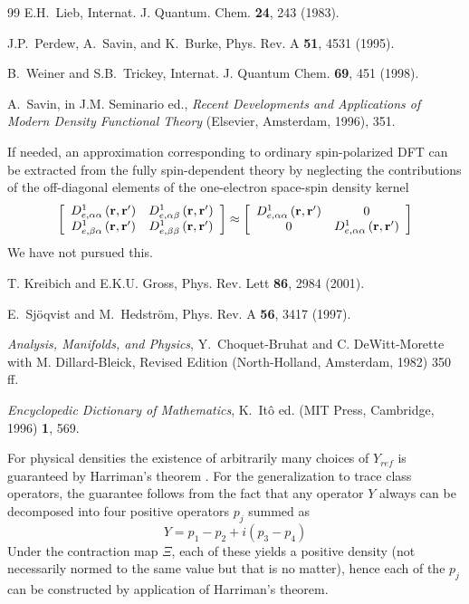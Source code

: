 \documentclass[aps,preprint]{revtex4}%
\begin{document}
\begin{thebibliography}{99}
E.H.~Lieb, Internat. J. Quantum. Chem. \textbf{24}, 243 (1983).

J.P.~Perdew, A.~Savin, and K.~Burke, Phys. Rev. A
\textbf{51}, 4531 (1995).

B.~Weiner and S.B.~Trickey, Internat. J. Quantum Chem.
\textbf{69}, 451 (1998).

A.~Savin, in J.M. Seminario ed., \textit{Recent
Developments and Applications of Modern Density Functional Theory} (Elsevier,
Amsterdam, 1996), 351.

If needed, an approximation corresponding to ordinary
spin-polarized DFT can be extracted from the fully spin-dependent theory by
neglecting the contributions of the off-diagonal elements of the one-electron
space-spin density kernel
\begin{equation}
\left[
\begin{array}
[c]{cc}%
D_{e,\alpha\alpha}^{1}\left(  \mathbf{r,r}^{\prime}\right)  & D_{e,\alpha
\beta}^{1}\left(  \mathbf{r,r}^{\prime}\right) \\
D_{e,\beta\alpha}^{1}\left(  \mathbf{r,r}^{\prime}\right)  & D_{e,\beta\beta
}^{1}\left(  \mathbf{r,r}^{\prime}\right)
\end{array}
\right]  \approx\left[
\begin{array}
[c]{cc}%
D_{e,\alpha\alpha}^{1}\left(  \mathbf{r,r}^{\prime}\right)  & 0\\
0 & D_{e,\alpha\alpha}^{1}\left(  \mathbf{r,r}^{\prime}\right)
\end{array}
\right] \nonumber
\end{equation}
We have not pursued this.

T. Kreibich and E.K.U. Gross, Phys. Rev. Lett
\textbf{86}, 2984 (2001).

E.~Sj\"oqvist and M.~Hedstr\"om, Phys. Rev. A \textbf{56},
3417 (1997).

\textit{Analysis, Manifolds, and Physics}, Y.~Choquet-Bruhat
and C. DeWitt-Morette with M. Dillard-Bleick, Revised Edition (North-Holland,
Amsterdam, 1982) 350 ff.

\textit{Encyclopedic Dictionary of Mathematics},
K.~It\^o ed. (MIT Press, Cambridge, 1996) \textbf{1}, 569.

For physical densities the existence of arbitrarily many
choices of $Y_{ref}$ is guaranteed by Harriman's theorem \cite{Harriman81}.
For the generalization to trace class operators, the guarantee follows from
the fact that any operator $Y$ always can be decomposed into four positive
operators $p_{j}$ summed as
\[
Y=p_{1}-p_{2}+i(p_{3}-p_{4})
\]
Under the contraction map $\Xi$, each of these yields a positive density (not
necessarily normed to the same value but that is no matter), hence each of the
$p_{j}$ can be constructed by application of Harriman's theorem.


\end{thebibliography}
\end{document}

